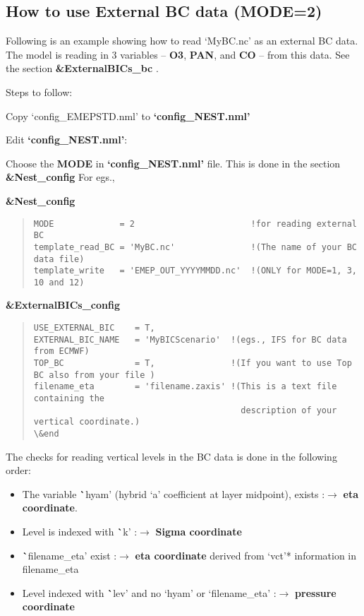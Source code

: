 \subsection{How to use External BC data (MODE=2)}

Following is an example showing how to read `MyBC.nc' as an external BC data.  
The model is reading in 3 variables – {\bf O3}, {\bf PAN}, and {\bf CO} – from this data.  See the 	section {\bf \&ExternalBICs\_bc} . 

Steps to follow: 

	Copy `config\_EMEPSTD.nml' to {\bf `config\_NEST.nml'} 

	Edit {\bf `config\_NEST.nml'}:	

	Choose the {\bf MODE} in {\bf `config\_NEST.nml'} file. This is done in the section {\bf \&Nest\_config}
For egs.,

{\bf \&Nest\_config}
\begin{quote}
\begin{verbatim}
MODE		     = 2			           !for reading external BC 
template_read_BC = 'MyBC.nc'   		       !(The name of your BC data file)
template_write   = 'EMEP_OUT_YYYYMMDD.nc'  !(ONLY for MODE=1, 3, 10 and 12)
\end{verbatim}
\end{quote}


{\bf \&ExternalBICs\_config}
\begin{quote}
\begin{verbatim}
USE_EXTERNAL_BIC 	= T,
EXTERNAL_BIC_NAME 	= 'MyBICScenario'  !(egs., IFS for BC data from ECMWF) 
TOP_BC 		    	= T,   		       !(If you want to use Top BC also from your file )
filename_eta		= 'filename.zaxis' !(This is a text file containing the 
                                         description of your vertical coordinate.)			
\&end
\end{verbatim}
\end{quote}


The checks for reading vertical levels in the BC data is done in the following order:
\begin{itemize}
\item The variable {\textbf `hyam'} (hybrid `a' coefficient at layer midpoint), exists :${\rightarrow}$ {\bf eta coordinate}. 
\item Level is indexed with {\textbf `k'}  :${\rightarrow}$ {\bf Sigma coordinate}
\item {\textbf `filename\_eta'} exist :${\rightarrow}$ {\bf eta coordinate} derived from `vct'*  information in filename\_eta
\item Level indexed with {\textbf`lev'} and no `hyam' or `filename\_eta' :${\rightarrow}$ {\bf pressure coordinate}	
\end{itemize}


